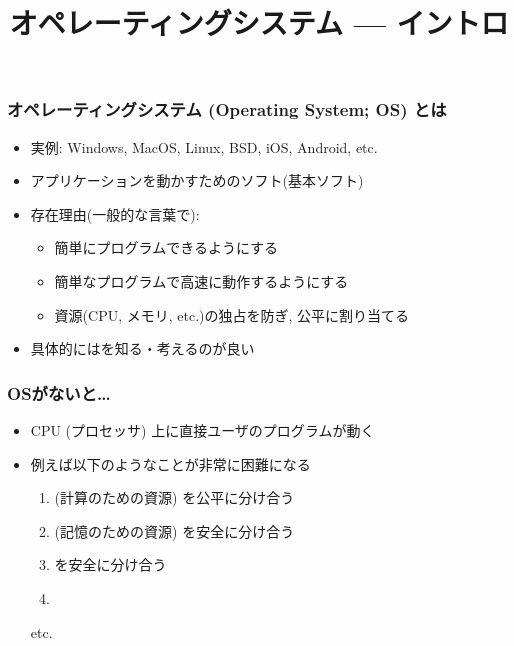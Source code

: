 \documentclass[12pt,dvipdfmx]{beamer}
\title{オペレーティングシステム --- イントロ}
\begin{document}
\maketitle


\section{}

\begin{frame}
\frametitle{オペレーティングシステム (Operating System; OS) とは}
\begin{itemize}
\item 実例: Windows, MacOS, Linux, BSD, iOS, Android, etc.
\item アプリケーションを動かすためのソフト(基本ソフト)
\item 存在理由(一般的な言葉で):
  \begin{itemize}
  \item {} 簡単にプログラムできるようにする
  \item {} 簡単なプログラムで高速に動作するようにする
  \item {} 資源(CPU, メモリ, etc.)の独占を防ぎ,
    公平に割り当てる
  \end{itemize}
\item 具体的にはを知る・考えるのが良い
\end{itemize}
\end{frame}

\begin{frame}
  \frametitle{OSがないと\ldots}
  \begin{itemize}
  \item CPU (プロセッサ) 上に直接ユーザのプログラムが動く
  \item 例えば以下のようなことが非常に困難になる
    \begin{enumerate}
    \item {} (計算のための資源) を公平に分け合う
    \item {} (記憶のための資源) を安全に分け合う
    \item {}を安全に分け合う
    \item {}
    \end{enumerate}
    etc.
  \end{itemize}
\end{frame}
\end{document}
